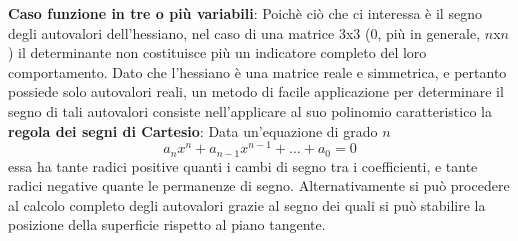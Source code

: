 \textbf{Caso funzione in tre o più variabili}:\newline
\newline
Poichè ciò che ci interessa è il segno degli autovalori dell'hessiano, nel caso di una matrice $3$x$3$ (0, più in generale, $n$x$n$) il determinante non costituisce più un indicatore  completo del loro comportamento.  Dato che l'hessiano è una matrice reale e simmetrica, e pertanto possiede solo autovalori reali, un metodo di facile applicazione per determinare il segno di tali autovalori consiste nell'applicare al suo polinomio caratteristico la \textbf{regola dei segni di Cartesio}:\newline
Data un'equazione di grado $n$
\[
    a_nx^n + a_{n-1}x^{n-1} +\dots + a_0 = 0 
\]
essa ha tante radici positive quanti i cambi di segno tra i coefficienti, e tante radici negative quante le permanenze di segno.\newline
\newline
Alternativamente si può procedere al calcolo completo degli autovalori grazie al segno dei quali si può stabilire la posizione della superficie rispetto al piano tangente.
